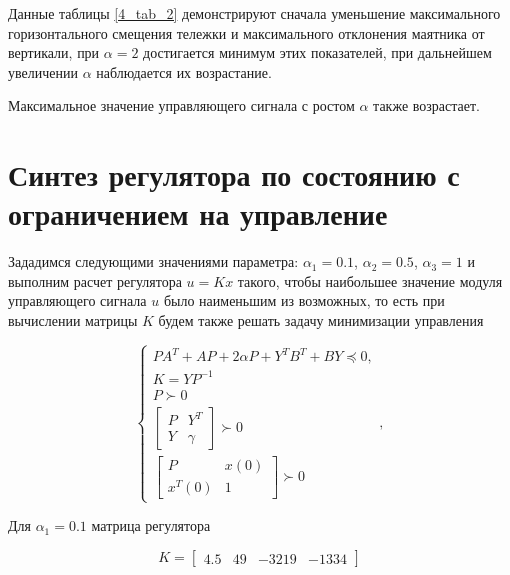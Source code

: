 Данные таблицы \ref{4_tab_2} демонстрируют сначала уменьшение максимального горизонтального смещения тележки и максимального отклонения маятника от вертикали, при $\alpha=2$ достигается минимум этих показателей, при дальнейшем увеличении $\alpha$ наблюдается их возрастание. 

Максимальное значение управляющего сигнала с ростом $\alpha$ также возрастает.


\section{Синтез регулятора по состоянию с ограничением на управление}

Зададимся следующими значениями параметра: $\alpha_1= 0.1$, $\alpha_2 = 0.5$, $\alpha_3 = 1$ и выполним расчет регулятора $u=Kx$ такого, чтобы наибольшее значение модуля управляющего сигнала $u$ было наименьшим из возможных, то есть при вычислении матрицы $K$ будем также решать задачу минимизации управления

\begin{equation}
    \begin{cases}
      PA^T+AP+2 \alpha P + Y^T B^T+BY \preceq 0,\\
        K = Y P^{-1}\\
        P \succ 0\\
        \begin{bmatrix}
            P & Y^T\\
            Y & \gamma
        \end{bmatrix} \succ 0\\[2pt]
        \begin{bmatrix}
            P & x(0)\\
            x^T(0) & 1
        \end{bmatrix} \succ 0
    \end{cases},
\end{equation}

Для $\alpha_1=0.1$ матрица регулятора

\begin{equation}
    K = \begin{bmatrix}
        4.5 & 49 & -3219 & -1334
    \end{bmatrix}
\end{equation}

